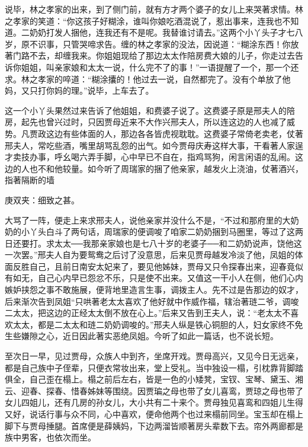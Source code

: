 \begin{parag}
    说毕，林之孝家的出来，到了侧门前，就有方才两个婆子的女儿上来哭著求情。林之孝家的笑道：“你这孩子好糊涂，谁叫你娘吃酒混说了，惹出事来，连我也不知道。二奶奶打发人捆他，连我还有不是呢。我替谁讨请去。”这两个小丫头子才七八岁，原不识事，只管哭啼求告。缠的林之孝家的没法，因说道：“糊涂东西！你放著门路不去，却缠我来。你姐姐现给了那边太太作陪房费大娘的儿子，你走过去告诉你姐姐，叫亲家娘和太太一说，什么完不了的事！”一语提醒了一个，那一个还求。林之孝家的啐道：“糊涂攮的！他过去一说，自然都完了。没有个单放了他妈，又只打你妈的理。”说毕，上车去了。
\end{parag}


\begin{parag}
    这一个小丫头果然过来告诉了他姐姐，和费婆子说了。这费婆子原是邢夫人的陪房，起先也曾兴过时，只因贾母近来不大作兴邢夫人，所以连这边的人也减了威势。凡贾政这边有些体面的人，那边各各皆虎视耽耽。这费婆子常倚老卖老，仗著邢夫人，常吃些酒，嘴里胡骂乱怨的出气。如今贾母庆寿这样大事，干看著人家逞才卖技办事，呼幺喝六弄手脚，心中早已不自在，指鸡骂狗，闲言闲语的乱闹。这边的人也不和他较量。如今听了周瑞家的捆了他亲家，越发火上浇油，仗著酒兴，指著隔断的墙\begin{note}庚双夹：细致之甚。\end{note}大骂了一阵，便走上来求邢夫人，说他亲家并没什么不是，“不过和那府里的大奶奶的小丫头白斗了两句话，周瑞家的便调唆了咱家二奶奶捆到马圈里，等过了这两日还要打。求太太──我那亲家娘也是七八十岁的老婆子──和二奶奶说声，饶他这一次罢。”邢夫人自为要鸳鸯之后讨了没意思，后来见贾母越发冷淡了他，凤姐的体面反胜自己，且前日南安太妃来了，要见他姊妹，贾母又只令探春出来，迎春竟似有如无，自己心内早已怨忿不乐，只是使不出来。又值这一干小人在侧，他们心内嫉妒挟怨之事不敢施展，便背地里造言生事，调拨主人。先不过是告那边的奴才，后来渐次告到凤姐“只哄著老太太喜欢了他好就中作威作福，辖治著琏二爷，调唆二太太，把这边的正经太太倒不放在心上。”后来又告到王夫人，说：“老太太不喜欢太太，都是二太太和琏二奶奶调唆的。”邢夫人纵是铁心铜胆的人，妇女家终不免生些嫌隙之心，近日因此著实恶绝凤姐。今听了如此一篇话，也不说长短。
\end{parag}


\begin{parag}
    至次日一早，见过贾母，众族人中到齐，坐席开戏。贾母高兴，又见今日无远亲，都是自己族中子侄辈，只便衣常妆出来，堂上受礼。当中独设一榻，引枕靠背脚踏俱全，自己歪在榻上。榻之前后左右，皆是一色的小矮凳，宝钗、宝琴、黛玉、湘云、迎春、探春、惜春姊妹等围绕。因贾㻞之母也带了女儿喜鸾，贾琼之母也带了女儿四姐儿，还有几房的孙女儿，大小共有二十来个。贾母独见喜鸾和四姐儿生得又好，说话行事与众不同，心中喜欢，便命他两个也过来榻前同坐。宝玉却在榻上脚下与贾母捶腿。首席便是薛姨妈，下边两溜皆顺著房头辈数下去。帘外两廊都是族中男客，也依次而坐。
\end{parag}


